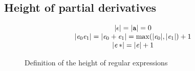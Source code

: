 


\subsection{Height of partial derivatives}\label{sec:height}
\begin{figure}
 $$
  \begin{array}{c}
   {\mid}{\ensuremath{\mathtt {\epsilon}}}{\mid}={\mid}{\mathtt {a}}{\mid}=0                                                              \\
   {\mid}{\mathit {e}_0\mathit {e}_1}{\mid}={\mid}{\mathit {e}_0\mathbin{+}\mathit {e}_1}{\mid}=\max({\mid}{\mathit {e}_0}{\mid},{\mid}{\mathit {e}_1}{\mid})+1 \\
   {\mid}{{{\mathit {e}}\mathop{*}}}{\mid}={\mid}{\mathit {e}}{\mid}+1
  \end{array}
 $$
 \caption{Definition of the height of regular expressions}
 \label{fig:height}
\end{figure}

